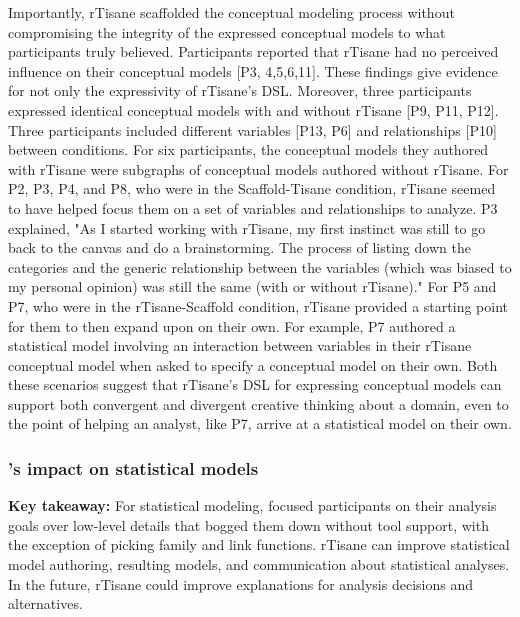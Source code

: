 Importantly, rTisane scaffolded the conceptual modeling process without
compromising the integrity of the expressed conceptual models to what
participants truly believed. Participants reported that rTisane had no perceived
influence on their conceptual models [P3, 4,5,6,11]. These findings give
evidence for not only the expressivity of rTisane’s DSL. Moreover, three
participants expressed identical conceptual models with and without rTisane [P9,
P11, P12]. Three participants included different variables [P13, P6] and
relationships [P10] between conditions. For six participants, the conceptual
models they authored with rTisane were subgraphs of conceptual models authored
without rTisane. For P2, P3, P4, and P8, who were in the Scaffold-Tisane
condition, rTisane seemed to have helped focus them on a set of variables and
relationships to analyze. P3 explained, "As I started working with rTisane, my
first instinct was still to go back to the canvas and do a brainstorming. The
process of listing down the categories and the generic relationship between the
variables (which was biased to my personal opinion) was still the same (with or
without rTisane)." For P5 and P7, who were in the rTisane-Scaffold condition,
rTisane provided a starting point for them to then expand upon on their own. For
example, P7 authored a statistical model involving an interaction between
variables in their rTisane conceptual model when asked to specify a conceptual
model on their own. Both these scenarios suggest that rTisane’s DSL for
expressing conceptual models can support both convergent and divergent creative
thinking about a domain, even to the point of helping an analyst, like P7,
arrive at a statistical model on their own. 


\subsubsection{\rTisane's impact on statistical models}
\textbf{Key takeaway:} For statistical modeling, \rTisane
focused participants on their analysis goals over low-level details that bogged
them down without tool support, with the exception of picking family and link
functions. rTisane can improve statistical model authoring, resulting models,
and communication about statistical analyses. In the future, rTisane could
improve explanations for analysis decisions and alternatives. 

